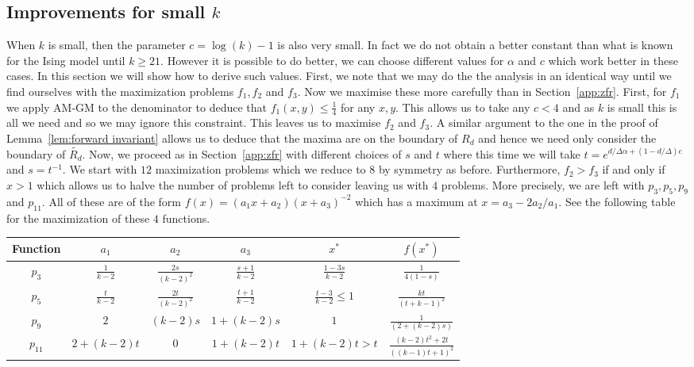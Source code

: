 \subsection{Improvements for small \texorpdfstring{$k$}{k}}
When $k$ is small, then the parameter $c=\log(k)-1$ is also very small.
In fact we do not obtain a better constant than what is known for the Ising model until $k \geq 21$.
However it is possible to do better, we can choose different values for $\alpha$ and $c$ which work better in these cases.
In this section we will show how to derive such values.
%
First, we note that we may do the the analysis in an identical way until we find ourselves with the maximization problems $f_1, f_2$ and $f_3$.
Now we maximise these more carefully than in Section~\ref{app:zfr}.
First, for $f_1$ we apply AM-GM to the denominator to deduce that $f_1(x,y) \leq \frac{1}{4}$ for any $x,y$.
This allows us to take any $c<4$ and as $k$ is small this is all we need and so we may ignore this constraint.
This leaves us to maximise $f_2$ and $f_3$.
A similar argument to the one in the proof of Lemma~\ref{lem:forward invariant} allows us to deduce that the maxima are on the boundary of $R_d$ and hence we need only consider the boundary of $\widetilde{R_d}$.
%
Now, we proceed as in Section~\ref{app:zfr} with different choices of $s$ and $t$ where this time we will take $t=e^{d/\Delta \alpha + (1-d/\Delta)c}$ and $s=t^{-1}$.
We start with $12$ maximization problems which we reduce to $8$ by symmetry as before.
Furthermore, $f_2>f_3$ if and only if $x>1$ which allows us to halve the number of problems left to consider leaving us with $4$ problems.
More precisely, we are left with $p_3, p_5, p_9$ and $p_{11}$.
All of these are of the form $f(x)=(a_1 x+a_2)(x+a_3)^{-2}$ which has a maximum at $x=a_3-2a_2/a_1$.
See the following table for the maximization of these $4$ functions.
%
\begin{center}
\begin{tabular}{ |c|c|c|c|c|c| }
\hline
Function & $a_1$ & $a_2$ & $a_3$ & $x^*$ & $f(x^*)$ 
\\ \hline
$p_3$ & $\frac{1}{k-2}$ & $\frac{2s}{(k-2)^2}$ & $\frac{s+1}{k-2}$ & $\frac{1-3s}{k-2}$ & $\frac{1}{4(1-s)}$
\\ \hline
$p_5$ & $\frac{t}{k-2}$ & $\frac{2t}{(k-2)^2}$ & $\frac{t+1}{k-2}$ & $\frac{t-3}{k-2}\leq 1$ & $\frac{kt}{(t+k-1)^2}$
\\ \hline
$p_9$ & $2$ & $(k-2)s$ & $1+(k-2)s$ & $1$ & $\frac{1}{(2+(k-2)s)}$
\\ \hline
$p_{11}$ & $2+(k-2)t$ & $0$ & $1+(k-2)t$ & $1+(k-2)t>t$ & $\frac{(k-2)t^2+2t}{((k-1)t+1)^2}$
\\ \hline
\end{tabular}
\end{center}
